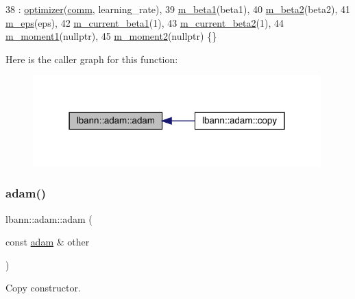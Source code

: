 \begin{DoxyCode}
38   : \hyperlink{classlbann_1_1optimizer_a136ed79c3f279ecded5be380fb67b05f}{optimizer}(\hyperlink{file__io_8cpp_ab048c6f9fcbcfaa57ce68b00263dbebe}{comm}, learning\_rate),
39     \hyperlink{classlbann_1_1adam_a73af15a28066edbfad9ba6a900746a19}{m\_beta1}(beta1),
40     \hyperlink{classlbann_1_1adam_ab1f2a16b8eb7e265895ea9eef3fe87b2}{m\_beta2}(beta2),
41     \hyperlink{classlbann_1_1adam_a751102f0fd866612f5685050a08020a9}{m\_eps}(eps),
42     \hyperlink{classlbann_1_1adam_a53c3034e187da2720447bbb4f2b59a5d}{m\_current\_beta1}(1),
43     \hyperlink{classlbann_1_1adam_ad38376b684d69d4a15da1d11f8808ca7}{m\_current\_beta2}(1),
44     \hyperlink{classlbann_1_1adam_aa10a518a5356257bc69e655b88b0ed67}{m\_moment1}(\textcolor{keyword}{nullptr}),
45     \hyperlink{classlbann_1_1adam_aea3295a0ee7da5e9c56fd6ff2f05c63f}{m\_moment2}(\textcolor{keyword}{nullptr}) \{\}
\end{DoxyCode}
Here is the caller graph for this function\+:\nopagebreak
\begin{figure}[H]
\begin{center}
\leavevmode
\includegraphics[width=315pt]{classlbann_1_1adam_a9d6848fa245bc2adfe142ae3aeb4e33d_icgraph}
\end{center}
\end{figure}
\mbox{\label{classlbann_1_1adam_a77464b030ec2be620155eff22acdff76}} 
\subsubsection{\texorpdfstring{adam()}{adam()}\hspace{0.1cm}{\footnotesize\ttfamily [2/2]}}
{\footnotesize\ttfamily lbann\+::adam\+::adam (\begin{DoxyParamCaption}\item[{const \hyperlink{classlbann_1_1adam}{adam} \&}]{other }\end{DoxyParamCaption})}

Copy constructor. 

